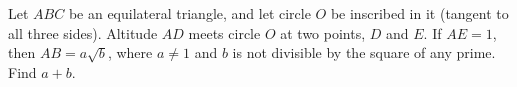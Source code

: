 Let $ABC$ be an equilateral triangle, and let circle $O$ be inscribed in it (tangent to all three sides). Altitude $AD$ meets circle $O$ at two points, $D$ and $E$. If $AE=1$, then $AB=a\sqrt b$, where $a\ne1$ and $b$ is not divisible by the square of any prime. Find $a+b$.
